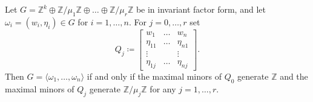 \documentclass[10pt,a4paper]{amsart}
\newcommand{\Z}{\mathbb{Z}}
\begin{document}
\begin{proposition}\label{generation condition}
    Let $G=\Z^k\oplus \Z/\mu_1\Z\oplus\dots\oplus\Z/\mu_r\Z$ be in invariant factor form, and let $\omega_i=(w_i,\eta_i)\in G$ for $i=1,\dots,n$. For $j=0,\dots,r$ set
    $$
    Q_j\coloneqq \begin{bmatrix}
        w_1 &\dots &w_n\\
        \eta_{11} & \dots & \eta_{n1}\\
        \vdots & & \vdots\\
        \eta_{1j} & \dots & \eta_{nj}
    \end{bmatrix}.
    $$
    Then $G=\langle \omega_1,\dots,\omega_n\rangle$ if and only if the maximal minors of $Q_0$ generate $\Z$ and the maximal minors of $Q_j$ generate $\Z/\mu_j\Z$ for any $j=1,\dots,r$. 
\end{proposition}
\end{document}
